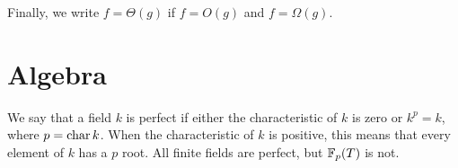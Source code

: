 Finally, we write $f = \Theta(g)$ if $f = O(g)$ and $f = \Omega(g)$.

\section{Algebra}
\label{Back:Algebra:Sec}

We say that a field $k$ is perfect if either the characteristic of $k$
is zero or $k^p = k$, where $p = \mathop{\rm char}\nolimits k$.  When the characteristic of
$k$ is positive, this means that every element of $k$ has a $p${\th}
root.  All finite fields are perfect, but $\mathbb{F}_p(T)$ is not.




